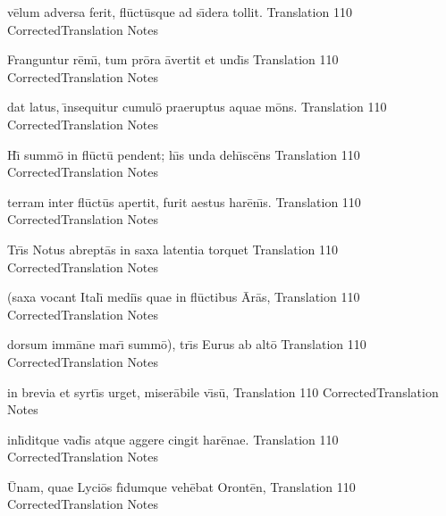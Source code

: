 \documentclass[]{book}
\begin{document}
	\latline
	  {v\={\macron e}lum adversa ferit, fl\={\macron u}ct\={\macron u}sque ad s\={\macron \i}dera tollit.}
	  { Translation }
	  {110}
	  { CorrectedTranslation }
	  { Notes }


	\newpage

	\latline
	  {Franguntur r\={\macron e}m\={\macron \i}, tum pr\={\macron o}ra \={\macron a}vertit et und\={\macron \i}s}
	  { Translation }
	  {110}
	  { CorrectedTranslation }
	  { Notes }


	\latline
	  {dat latus, \={\macron \i}nsequitur cumul\={\macron o} praeruptus aquae m\={\macron o}ns.}
	  { Translation }
	  {110}
	  { CorrectedTranslation }
	  { Notes }


	\latline
	  {H\={\macron \i} summ\={\macron o} in fl\={\macron u}ct\={\macron u} pendent; h\={\macron \i}s unda deh\={\macron \i}sc\={\macron e}ns}
	  { Translation }
	  {110}
	  { CorrectedTranslation }
	  { Notes }


	\newpage

	\latline
	  {terram inter fl\={\macron u}ct\={\macron u}s apertit, furit aestus har\={\macron e}n\={\macron \i}s.}
	  { Translation }
	  {110}
	  { CorrectedTranslation }
	  { Notes }


	\latline
	  {Tr\={\macron \i}s Notus abrept\={\macron a}s in saxa latentia torquet}
	  { Translation }
	  {110}
	  { CorrectedTranslation }
	  { Notes }


	\latline
	  {(saxa vocant Ital\={\macron \i} medi\={\macron \i}s quae in fl\={\macron u}ctibus \={\macron A}r\={\macron a}s,}
	  { Translation }
	  {110}
	  { CorrectedTranslation }
	  { Notes }


	\newpage

	\latline
	  {dorsum imm\={\macron a}ne mar\={\macron \i} summ\={\macron o}), tr\={\macron \i}s Eurus ab alt\={\macron o}}
	  { Translation }
	  {110}
	  { CorrectedTranslation }
	  { Notes }


	\latline
	  {in brevia et syrt\={\macron \i}s urget, miser\={\macron a}bile v\={\macron \i}s\={\macron u},}
	  { Translation }
	  {110}
	  { CorrectedTranslation }
	  { Notes }


	\latline
	  {inl\={\macron \i}ditque vad\={\macron \i}s atque aggere cingit har\={\macron e}nae.}
	  { Translation }
	  {110}
	  { CorrectedTranslation }
	  { Notes }


	\newpage

	\latline
	  {\={\macron U}nam, quae Lyci\={\macron o}s f\={\macron \i}dumque veh\={\macron e}bat Oront\={\macron e}n,}
	  { Translation }
	  {110}
	  { CorrectedTranslation }
	  { Notes }
\end{document}
